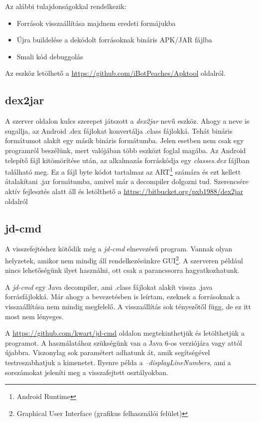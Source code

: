 \documentclass{thesis-ekf}
\theoremstyle{definition}
\theoremstyle{remark}
\begin{document}
Az alábbi tulajdonságokkal rendelkezik:

\begin{itemize}
	\item Források visszaállítása majdnem eredeti formájukba
	\item Újra buildelése a dekódolt forrásoknak bináris APK/JAR fájlba
	\item Smali kód debuggolás
\end{itemize}

Az eszköz letölhető a \url{https://github.com/iBotPeaches/Apktool} oldalról.

\subsection{dex2jar}

A  szerver oldalon kulcs szerepet játszott a \emph{dex2jar} nevű eszköz.
Ahogy a neve is sugallja, az Android .dex fájlokat konvertálja .class fájlokká.
Tehát bináris formátumot alakít egy másik bináris formátumba.
Jelen esetben nem csak egy programról beszélünk, mert valójában több eszközt foglal magába.
Az Android telepítő fájl kitömörítése után, az alkalmazás forráskódja egy \emph{classes.dex} fájlban található meg.
Ez a fájl byte kódot tartalmaz az ART\footnote{Android Runtime} számára és ezt kellett átalakítani .jar formátumba, amivel már a decompiler dolgozni tud.
Szerencsére aktív fejlesztés alatt áll és letölthető a \url{https://bitbucket.org/pxb1988/dex2jar} oldalról

\subsection{jd-cmd}

A visszefejtéshez kötődik még a \emph{jd-cmd} elnevezésű program.
Vannak olyan helyzetek, amikor nem mindig áll rendelkezésünkre GUI\footnote{Graphical User Interface (grafikus felhasználói felület)}.
A szerveren például nincs lehetőségünk ilyet használni, ott csak a parancssorra hagyatkozhatunk.

A \emph{jd-cmd} egy Java decompiler, ami .class fájlokat alakít vissza .java forrásfájlokká.
Már ahogy a bevezetésben is leírtam, ezeknek a forrásoknak a visszaállítása nem mindig megfelelő.
A visszaállítás sok tényezőtől függ, de ez itt most nem lényeges.

A \url{https://github.com/kwart/jd-cmd} oldalon megtekinthetjük és letölthetjük a programot.
A használatához szükségünk van a Java 6-os verziójára vagy attól újabbra.
Viszonylag sok paramétert adhatunk át, amik segítségével testreszabhatjuk a kimenetet.
Ilyenre példa a \emph{--displayLineNumbers}, ami a sorszámokat jeleníti meg a visszafejtett osztályokban.
\end{document}
